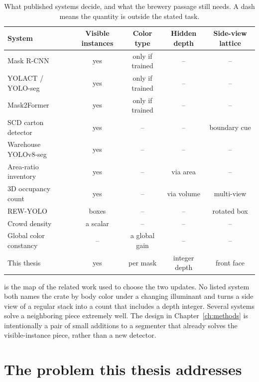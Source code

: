 \begin{table}[t]
\centering
\caption{What published systems decide, and what the brewery passage still needs. A dash means the quantity is outside the stated task.}
\label{tab:gap}
\footnotesize
\setlength{\tabcolsep}{3.5pt}
\begin{tabular}{@{}lcccc@{}}
\toprule
System & Visible instances & Color type & Hidden depth & Side-view lattice \\
\midrule
Mask R-CNN~\cite{he2017maskrcnn} & yes & only if trained & -- & -- \\
YOLACT / YOLO-seg~\cite{bolya2019yolact,jocher2023yolov8} & yes & only if trained & -- & -- \\
Mask2Former~\cite{cheng2022mask2former} & yes & only if trained & -- & -- \\
SCD carton detector~\cite{yang2022scd} & yes & -- & -- & boundary cue \\
Warehouse YOLOv8-seg~\cite{zhang2025warehouse} & yes & -- & -- & -- \\
Area-ratio inventory~\cite{hu2025arbca} & yes & -- & via area & -- \\
3D occupancy count~\cite{dumery2024stacked} & yes & -- & via volume & multi-view \\
REW-YOLO~\cite{wang2025rewyolo} & boxes & -- & -- & rotated box \\
Crowd density~\cite{li2018csrnet} & a scalar & -- & -- & -- \\
Global color constancy~\cite{barron2017ffcc} & -- & a global gain & -- & -- \\
\midrule
This thesis & yes & per mask & integer depth & front face \\
\bottomrule
\end{tabular}
\end{table}

 is the map of the related work used to choose the two updates. No listed system both names the crate by body color under a changing illuminant and turns a side view of a regular stack into a count that includes a depth integer. Several systems solve a neighboring piece extremely well. The design in Chapter~\ref{ch:methods} is intentionally a pair of small additions to a segmenter that already solves the visible-instance piece, rather than a new detector.



\section{The problem this thesis addresses}
\label{sec:scene}

